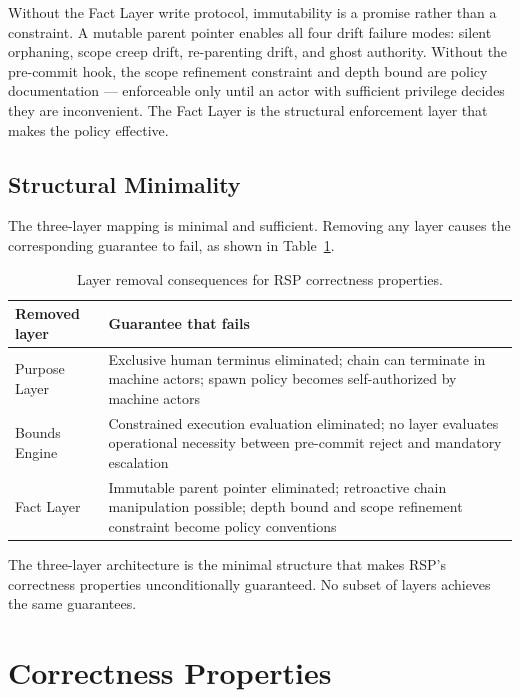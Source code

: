 Without the Fact Layer write protocol, immutability is a promise rather than a constraint. A mutable parent pointer enables all four drift failure modes: silent orphaning, scope creep drift, re-parenting drift, and ghost authority. Without the pre-commit hook, the scope refinement constraint and depth bound are policy documentation --- enforceable only until an actor with sufficient privilege decides they are inconvenient. The Fact Layer is the structural enforcement layer that makes the policy effective.

\subsection{Structural Minimality}
\label{sec:rs-minimality}

The three-layer mapping is minimal and sufficient. Removing any layer causes the corresponding guarantee to fail, as shown in Table~\ref{tab:rs-layer-minimality}.

\begin{table}[h]
\centering
\begin{tabular}{p{3.2cm} p{4.8cm}}
\toprule
\textbf{Removed layer} & \textbf{Guarantee that fails} \\
\midrule
Purpose Layer & Exclusive human terminus eliminated; chain can terminate in machine actors; spawn policy becomes self-authorized by machine actors \\
Bounds Engine & Constrained execution evaluation eliminated; no layer evaluates operational necessity between pre-commit reject and mandatory escalation \\
Fact Layer & Immutable parent pointer eliminated; retroactive chain manipulation possible; depth bound and scope refinement constraint become policy conventions \\
\bottomrule
\end{tabular}
\caption{Layer removal consequences for RSP correctness properties.}
\label{tab:rs-layer-minimality}
\end{table}

The three-layer architecture is the minimal structure that makes RSP's correctness properties unconditionally guaranteed. No subset of layers achieves the same guarantees.

\section{Correctness Properties}
\label{sec:rs-correctness}

